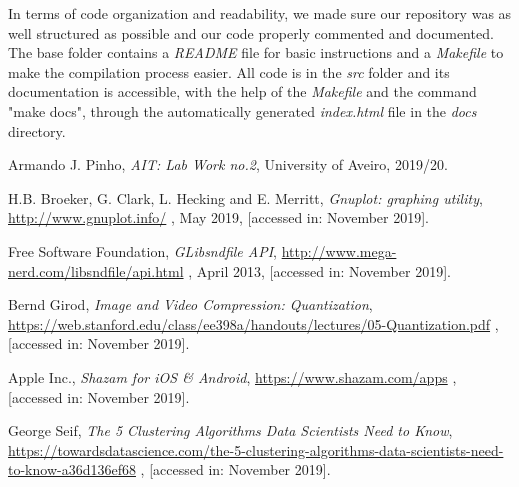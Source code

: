 \documentclass[12pt]{article}
\begin{document}
In terms of code organization and readability, we made sure our 
repository was as well structured as possible and our code properly commented
and documented.
The base folder contains a {\it README\/} file for basic instructions and a 
{\it Makefile\/} to make the compilation process easier.
All code is in the {\it src\/} folder and its documentation is accessible, 
with the help of the {\it Makefile\/} and the command "make docs", through
the automatically generated {\it index.html\/} file in the {\it docs\/} 
directory.

\newpage
\begin{thebibliography}{9}
  

    Armando J. Pinho,
    \textit{AIT: Lab Work no.2},
    University of Aveiro,
    2019/20.
  
    H.B. Broeker, G. Clark, L. Hecking and E. Merritt,
    \textit{Gnuplot: graphing utility},
    \url{http://www.gnuplot.info/} ,
    May 2019,
    [accessed in: November 2019].

    Free Software Foundation,
    \textit{GLibsndfile API},
    \url{http://www.mega-nerd.com/libsndfile/api.html} ,
    April 2013,
    [accessed in: November 2019].

    Bernd Girod,
    \textit{Image and Video Compression: Quantization},
    \url{https://web.stanford.edu/class/ee398a/handouts/lectures/05-Quantization.pdf} ,
    [accessed in: November 2019].

    Apple Inc.,
    \textit{Shazam for iOS \& Android},
    \url{https://www.shazam.com/apps} ,
    [accessed in: November 2019].

    George Seif,
    \textit{The 5 Clustering Algorithms Data Scientists Need to Know},
    \url{https://towardsdatascience.com/the-5-clustering-algorithms-data-scientists-need-to-know-a36d136ef68} ,
    [accessed in: November 2019].

\end{thebibliography}

\clearpage
\end{document}
